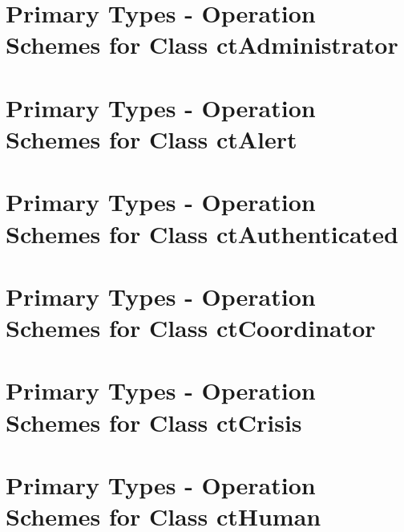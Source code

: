 \section{Primary Types - Operation Schemes for Class ctAdministrator} 
\label{OM-CM-PTClass-ctAdministrator}

\section{Primary Types - Operation Schemes for Class ctAlert} 
\label{OM-CM-PTClass-ctAlert}


\section{Primary Types - Operation Schemes for Class ctAuthenticated} 
\label{OM-CM-PTClass-ctAuthenticated}

\section{Primary Types - Operation Schemes for Class ctCoordinator} 
\label{OM-CM-PTClass-ctCoordinator}

\section{Primary Types - Operation Schemes for Class ctCrisis} 
\label{OM-CM-PTClass-ctCrisis}





\section{Primary Types - Operation Schemes for Class ctHuman} 
\label{OM-CM-PTClass-ctHuman}


